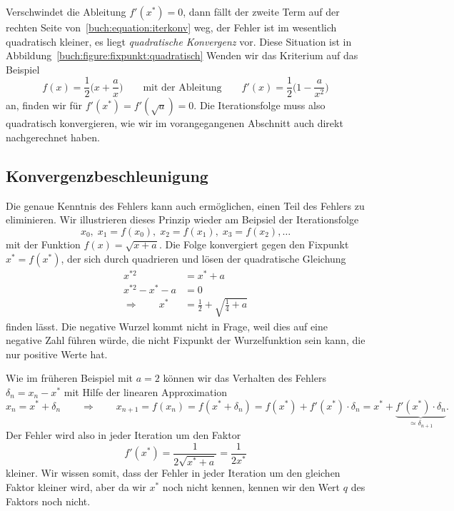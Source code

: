 Verschwindet die Ableitung $f'(x^*)=0$, dann fällt der zweite Term
auf der rechten Seite von~\eqref{buch:equation:iterkonv} weg, der
Fehler ist im wesentlich quadratisch kleiner, es liegt {\em quadratische
Konvergenz} vor.
%
%
Diese Situation ist in Abbildung~\ref{buch:figure:fixpunkt:quadratisch}
Wenden wir das Kriterium auf das Beispiel 
\[
f(x) = \frac12\biggl( x + \frac{a}{x}\biggr)
\qquad\text{mit der Ableitung}\qquad
f'(x) = \frac12\biggl( 1 -\frac{a}{x^2}\biggr)
\]
an, finden wir für $f'(x^*)=f'(\sqrt{a}) = 0$.
Die Iterationsfolge muss also quadratisch konvergieren, wie wir
im vorangegangenen Abschnitt auch direkt nachgerechnet haben.

%
%
\subsection{Konvergenzbeschleunigung
\label{buch:subsection:konvergenzbeschleunigung}}
Die genaue Kenntnis des Fehlers kann auch ermöglichen, einen Teil
des Fehlers zu eliminieren.
Wir illustrieren dieses Prinzip wieder am Beipsiel der Iterationsfolge
\[
x_0,\; x_1=f(x_0),\; x_2=f(x_1),\;x_3=f(x_2),\dots
\]
mit der Funktion $f(x)=\sqrt{x+a}$.
Die Folge konvergiert gegen den Fixpunkt $x^* = f(x^*)$, der
sich durch quadrieren und lösen der quadratische
Gleichung
\begin{align*}
x^{*2} &= x^*+a\\
x^{*2} - x^*-a&=0\\
\Rightarrow\qquad
x^* &= \frac12 +\sqrt{\frac14+a}
\end{align*}
finden lässt.
Die negative Wurzel kommt nicht in Frage, weil dies auf eine negative Zahl
führen würde, die nicht Fixpunkt der Wurzelfunktion sein kann, die nur
positive Werte hat.

Wie im früheren Beispiel mit $a=2$ können wir das Verhalten des Fehlers
$\delta_n = x_n-x^*$
mit Hilfe der linearen Approximation
\[
x_n = x^* + \delta_n
\qquad\Rightarrow\qquad
x_{n+1} = f(x_n) = f(x^* + \delta_n) = f(x^*) + f'(x^*)\cdot \delta_n
=
x^* + \underbrace{f'(x^*)\cdot \delta_n}_{\displaystyle\simeq\delta_{n+1}}.
\]
Der Fehler wird also in jeder Iteration um den Faktor
\[
f'(x^*) = \frac1{2\sqrt{x^*+a}}=\frac1{2x^*}
\]
kleiner.
Wir wissen somit, dass der Fehler in jeder Iteration um den gleichen Faktor
kleiner wird, aber da wir $x^*$ noch nicht kennen, kennen wir den Wert $q$
des Faktors noch nicht.

